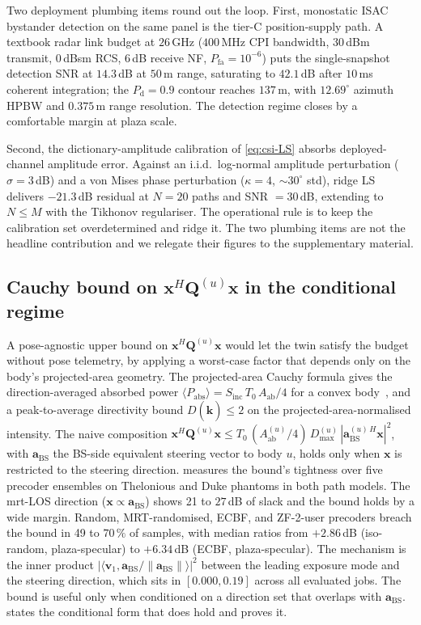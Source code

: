 \documentclass[journal,twocolumn,10pt]{IEEEtran}
\theoremstyle{plain}
\theoremstyle{remark}
\newcommand{\khat}{\hat{\bm{k}}}
\newcommand{\xx}{\mathbf{x}}
\newcommand{\Sinc}{S_{\mathrm{inc}}}
\newcommand{\Pabs}{P_{\mathrm{abs}}}
\newcommand{\Aab}{A_{\mathrm{ab}}}
\newcommand{\Qmat}{\mathbf{Q}}
\begin{document}
Two deployment plumbing items round out the loop. First, monostatic
ISAC bystander detection on the same panel is the tier-C
position-supply path. A textbook radar link budget at $26\,$GHz
($400\,$MHz CPI bandwidth, $30\,$dBm transmit, $0\,$dBsm RCS,
$6\,$dB receive NF, $P_{\mathrm{fa}} = 10^{-6}$) puts the
single-snapshot detection SNR at $14.3\,$dB at $50\,$m range,
saturating to $42.1\,$dB after $10\,$ms coherent integration; the
$P_{\mathrm{d}} = 0.9$ contour reaches $137\,$m, with $12.69^\circ$
azimuth HPBW and $0.375\,$m range resolution. The detection regime
closes by a comfortable margin at plaza scale.

Second, the dictionary-amplitude calibration of \cref{eq:csi-LS}
absorbs deployed-channel amplitude error. Against an i.i.d.\
log-normal amplitude perturbation ($\sigma = 3\,$dB) and a von Mises
phase perturbation ($\kappa = 4$, $\sim 30^\circ$ std), ridge LS
delivers $-21.3\,$dB residual at $N = 20$ paths and SNR $= 30\,$dB,
extending to $N \leq M$ with the Tikhonov regulariser. The operational
rule is to keep the calibration set overdetermined and ridge it. The
two plumbing items are not the headline contribution and we relegate
their figures to the supplementary material.

\subsection{Cauchy bound on $\xx^H \Qmat^{(u)} \xx$
in the conditional regime}\label{sec:eval-cauchy}

A pose-agnostic upper bound on $\xx^H \Qmat^{(u)} \xx$ would let the
twin satisfy the budget without pose telemetry, by applying a
worst-case factor that depends only on the body's projected-area
geometry. The projected-area Cauchy formula gives the
direction-averaged absorbed power $\langle \Pabs \rangle =
\Sinc\,T_0\,\Aab/4$ for a convex body~\cite{Cauchy1841}, and a
peak-to-average directivity bound $D(\khat) \leq 2$ on the
projected-area-normalised intensity. The naive composition
$\xx^H \Qmat^{(u)} \xx \leq T_0\,(\Aab^{(u)}/4)\,D_{\max}^{(u)}\,
|\mathbf{a}_{\mathrm{BS}}^{(u)\,H} \xx|^2$, with
$\mathbf{a}_{\mathrm{BS}}$ the BS-side equivalent steering vector
to body $u$, holds only when $\xx$ is restricted to the steering
direction. \Cref{fig:tightness} measures the bound's tightness
over five precoder ensembles on Thelonious and Duke phantoms in both
path models. The mrt-LOS direction
($\xx \propto \mathbf{a}_{\mathrm{BS}}$) shows 21 to $27\,$dB of
slack and the bound holds by a wide margin. Random,
MRT-randomised, ECBF, and ZF-2-user precoders breach the bound
in 49 to $70\,\%$ of samples, with median ratios from $+2.86\,$dB
(iso-random, plaza-specular) to $+6.34\,$dB (ECBF, plaza-specular).
The mechanism is the inner product
$|\langle \mathbf{v}_1, \mathbf{a}_{\mathrm{BS}}/
\|\mathbf{a}_{\mathrm{BS}}\| \rangle|^2$ between the leading
exposure mode and the steering direction, which sits in
$[0.000, 0.19]$ across all evaluated jobs. The bound is useful
only when conditioned on a direction set that overlaps with
$\mathbf{a}_{\mathrm{BS}}$.  states the conditional
form that does hold and proves it.
\end{document}
